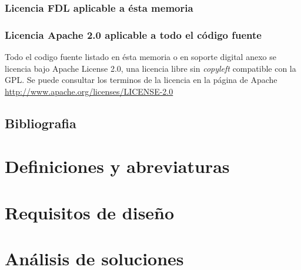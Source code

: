 \subsubsection{Licencia FDL aplicable a ésta memoria}

\subsubsection{Licencia Apache 2.0 aplicable a todo el código fuente}
Todo el codigo fuente listado en ésta memoria o en soporte digital anexo se licencia bajo Apache License 2.0, una licencia libre sin \emph{copyleft} compatible con la GPL.
Se puede consultar los terminos de la licencia en la página de Apache \url{http://www.apache.org/licenses/LICENSE-2.0}


\subsection{Bibliografia}
\printbibliography[title={Referencias},heading=none]
\nopagebreak
\section{Definiciones y abreviaturas}
\section{Requisitos de diseño}



\section{Análisis de soluciones}






